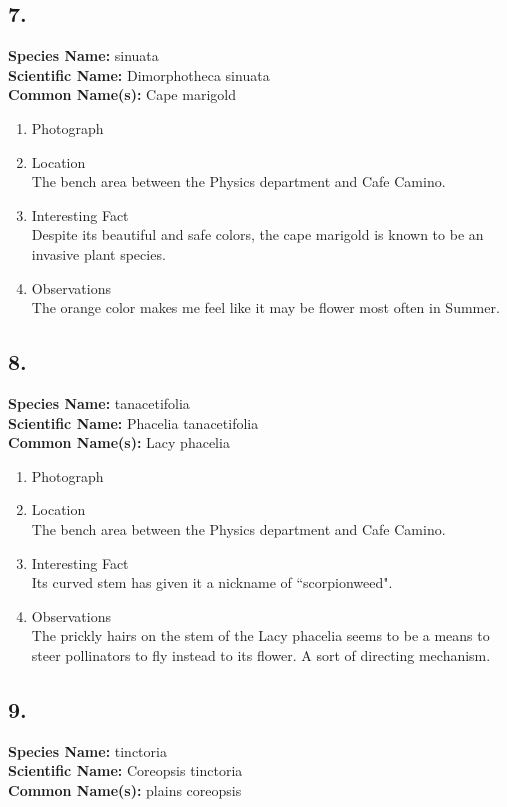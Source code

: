 \documentclass{article}
\begin{document}
\subsection{7.}
\textbf{Species Name: } sinuata \\
\textbf{Scientific Name: } Dimorphotheca sinuata \\
\textbf{Common Name(s): } Cape marigold

\begin{enumerate}[label = \textbf{\arabic*)}]
	\item Photograph
	\item Location \\
		The bench area between the Physics department and Cafe Camino.
	\item Interesting Fact \\
		Despite its beautiful and safe colors, the cape marigold is known to be an invasive plant species.
	\item Observations \\
		The orange color makes me feel like it may be flower most often in Summer.
\end{enumerate}

\subsection{8.}
\textbf{Species Name: } tanacetifolia \\
\textbf{Scientific Name: } Phacelia tanacetifolia \\
\textbf{Common Name(s): } Lacy phacelia

\begin{enumerate}[label = \textbf{\arabic*)}]
	\item Photograph

	\item Location \\
		The bench area between the Physics department and Cafe Camino.
	\item Interesting Fact \\
		Its curved stem has given it a nickname of ``scorpionweed".
	\item Observations \\
		The prickly hairs on the stem of the Lacy phacelia seems to be a means to steer pollinators to fly instead to its flower. A sort of directing mechanism.
\end{enumerate}

\subsection{9.}
\textbf{Species Name: } tinctoria \\
\textbf{Scientific Name: } Coreopsis tinctoria \\
\textbf{Common Name(s): } plains coreopsis
\end{document}
